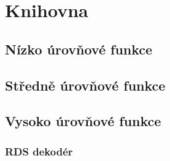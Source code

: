 \section{Knihovna}
\label{sec:knihovna}


\subsection{Nízko úrovňové funkce}

\subsection{Středně úrovňové funkce}

\subsection{Vysoko úrovňové funkce}
\subsubsection{RDS dekodér}
